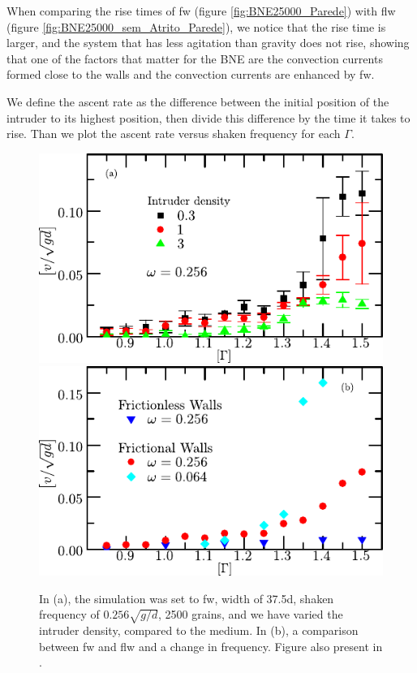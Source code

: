     When comparing the rise times of fw (figure \ref{fig:BNE25000_Parede}) with flw (figure \ref{fig:BNE25000_sem_Atrito_Parede}), we notice that the rise time is larger, and the system that has less agitation than gravity does not rise, showing that one of the factors that matter for the BNE are the convection currents formed close to the walls and the convection currents are enhanced by fw.

    We define the ascent rate as the difference between the initial position of the intruder to its highest position, then divide this difference by the time it takes to rise. Than we plot the ascent rate versus shaken frequency for each $\Gamma$.

\begin{figure}
    \centering
    \includegraphics[width=0.65\linewidth]{04-figuras/BNE_FW_Density.pdf} \\
    \includegraphics[width=0.65\linewidth]{04-figuras/BNE_W.pdf}
    \caption[BNE with frictional walls: Ascent rate versus $\Gamma$.]{In (a), the simulation was set to fw, width of 37.5d, shaken frequency of $0.256\sqrt{g/d}$, 2500 grains, and we have varied the intruder density, compared to the medium. In (b), a comparison between fw and flw and a change in frequency. Figure also present in \cite{Large-deviation_quantification_of_boundary_conditions_on_the_Brazil_nut_effect}.}
    \label{fig:BNE_walls}
\end{figure}


